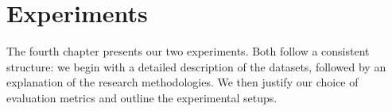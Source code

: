 \chapter{Experiments}
\label{chap:exp}

The fourth chapter presents our two experiments. Both follow a consistent structure: we begin with a detailed description of the datasets, followed by an explanation of the research methodologies. We then justify our choice of evaluation metrics and outline the experimental setups.





